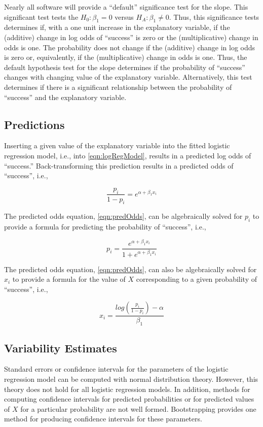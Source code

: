 \documentclass[10pt,openany]{book}\usepackage[]{graphicx}\usepackage[]{color}
\begin{document}
Nearly all software will provide a ``default'' significance test for the slope.  This significant test tests the $H_{0}:\beta_{1}=0$ versus $H_{A}:\beta_{1}\neq0$.  Thus, this significance tests determines if, with a one unit increase in the explanatory variable, if the (additive) change in log odds of ``success'' is zero or the (multiplicative) change in odds is one.  The probability does not change if the (additive) change in log odds is zero or, equivalently, if the (multiplicative) change in odds is one.  Thus, the default hypothesis test for the slope determines if the probability of ``success'' changes with changing value of the explanatory variable.  Alternatively, this test determines if there is a significant relationship between the probability of ``success'' and the explanatory variable.

\subsection{Predictions}
Inserting a given value of the explanatory variable into the fitted logistic regression model, i.e., into \eqref{eqn:logRegModel}, results in a predicted log odds of ``success.''  Back-transforming this prediction results in a predicted odds of ``success'', i.e.,

\begin{equation} \label{eqn:predOdds}
  \frac{p_{i}}{1-p_{i}}  = e^{\alpha + \beta_{1}x_{i}}
\end{equation}

The predicted odds equation, \eqref{eqn:predOdds}, can be algebraically solved for $p_{i}$ to provide a formula for predicting the probability of ``success'', i.e.,

\begin{equation}\label{eqn:predProb}
  p_{i} = \frac{e^{\alpha + \beta_{1}x_{i}}}{1+e^{\alpha + \beta_{1}x_{i}}}
\end{equation}

The predicted odds equation, \eqref{eqn:predOdds}, can also be algebraically solved for $x_{i}$ to provide a formula for the value of $X$ corresponding to a given probability of ``success'', i.e.,

\begin{equation}\label{eqn:predX}
  x_{i} = \frac{log\left(\frac{p_{i}}{1-p_{i}}\right) - \alpha}{\beta_{1}}
\end{equation}

\subsection{Variability Estimates}
Standard errors or confidence intervals for the parameters of the logistic regression model can be computed with normal distribution theory.  However, this theory does not hold for all logistic regression models.  In addition, methods for computing confidence intervals for predicted probabilities or for predicted values of $X$ for a particular probability are not well formed.  Bootstrapping provides one method for producing confidence intervals for these parameters.
\end{document}
